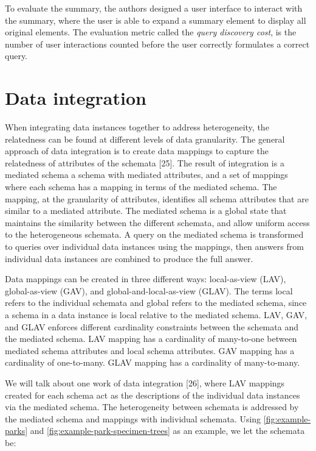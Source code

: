 To evaluate the summary, the authors designed a user interface to interact with the summary, where the user is able to expand a summary element to display all original elements. The evaluation metric called the \textit{query discovery cost}, is the number of user interactions counted before the user correctly formulates a correct query.

\section{Data integration}
\label{sec:DataIntegration}

When integrating data instances together to address heterogeneity, the relatedness can be found at different levels of data granularity. The general approach of data integration is to create data mappings to capture the relatedness of attributes of the schemata \cite{Lenzerini2002Data}[25]. The result of integration is a mediated schema a schema with mediated attributes, and a set of mappings where each schema has a mapping in terms of the mediated schema. The mapping, at the granularity of attributes, identifies all schema attributes that are similar to a mediated attribute. The mediated schema is a global state that maintains the similarity between the different schemata, and allow uniform access to the heterogeneous schemata. A query on the mediated schema is transformed to queries over individual data instances using the mappings, then answers from individual data instances are combined to produce the full answer.

Data mappings can be created in three different ways: local-as-view (LAV), global-as-view (GAV), and global-and-local-as-view (GLAV). The terms local refers to the individual schemata and global refers to the mediated schema, since a schema in a data instance is local relative to the mediated schema. LAV, GAV, and GLAV enforces different cardinality constraints between the schemata and the mediated schema. LAV mapping has a cardinality of many-to-one between mediated schema attributes and local schema attributes. GAV mapping has a cardinality of one-to-many. GLAV mapping has a cardinality of many-to-many.

We will talk about one work of data integration \cite{Levy1996Querying}[26], where LAV mappings created for each schema act as the descriptions of the individual data instances via the mediated schema. The heterogeneity between schemata is addressed by the mediated schema and mappings with individual schemata. Using \autoref{fig:example-parks} and \autoref{fig:example-park-specimen-trees} as an example, we let the schemata be:

